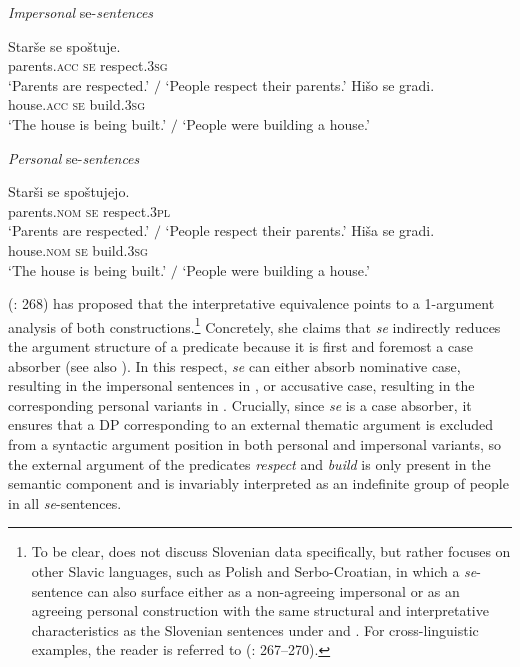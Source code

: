 \documentclass[output=paper,
modfonts,nonflat,
newtxmath
]{langsci/langscibook}
\begin{document}
\begin{exe}
\ex \textit{Impersonal} se-\textit{sentences}  \label{ex:lenardic: 2}
\begin{xlist}
\ex \gll Starše se spoštuje.\\
parents.\textsc{acc} \textsc{se} respect.\textsc{3sg}\\
\trans `Parents are respected.' $/$ `People respect their parents.'
\ex \gll Hišo se gradi.\\
house.\textsc{acc} \textsc{se} build.\textsc{3sg}\\
\trans `The house is being built.' $/$ `People were building a house.'
\end{xlist}
\ex \textit{Personal} se-\textit{sentences} \label{ex:lenardic: 3}
\begin{xlist}
\ex \gll Starši se spoštujejo.\\
parents.\textsc{nom} \textsc{se} respect.\textsc{3pl}\\
\trans `Parents are respected.' $/$ `People respect their parents.'
\ex \gll Hiša se gradi.\\
house.\textsc{nom} \textsc{se} build.\textsc{3sg}\\
\trans `The house is being built.' $/$ `People were building a house.'
\end{xlist}
\end{exe} 
\par

\noindent \citeauthor{marelj2004} (\citeyear{marelj2004}: 268) has proposed that the interpretative equivalence points to a 1-argument analysis of both constructions.\footnote{To be clear, \citet{marelj2004} does not discuss Slovenian data specifically, but rather focuses on other Slavic languages, such as Polish and Serbo-Croatian, in which a \textit{se}-sentence can also surface either as a non-agreeing impersonal or as an agreeing personal construction with the same structural and interpretative characteristics as the Slovenian sentences under  and . For cross-linguistic examples, the reader is referred to \citeauthor{marelj2004} (\citeyear{marelj2004}: 267--270).} Concretely, she claims that \textit{se} indirectly reduces the argument structure of a predicate because it is first and foremost a case absorber (see also \citealt{givon1998,franks1995}). In this respect, \textit{se} can either absorb nominative case, resulting in the impersonal sentences in , or accusative case, resulting in the corresponding personal variants in . Crucially, since \textit{se} is a case absorber, it ensures that a DP corresponding to an external thematic argument is excluded from a syntactic argument position in both personal and impersonal variants, so the external argument of the predicates \textit{respect} and \textit{build}  is only present in the semantic component and is invariably interpreted as an indefinite group of people in all \textit{se}-sentences. \par
\end{document}

